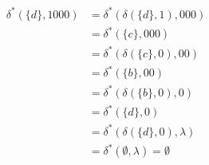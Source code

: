 
\begin{align*}
	\delta^*(\{d\},1000)&=\delta^*(\delta(\{d\},1),000)\\
	&=\delta^*(\{c\},000)\\
	&=\delta^*(\delta(\{c\},0),00)\\
	&=\delta^*(\{b\},00)\\
	&=\delta^*(\delta(\{b\},0),0)\\
	&=\delta^*(\{d\},0)\\
	&=\delta^*(\delta(\{d\},0),\lambda)\\
	&=\delta^*(\emptyset,\lambda)=\emptyset
\end{align*}
